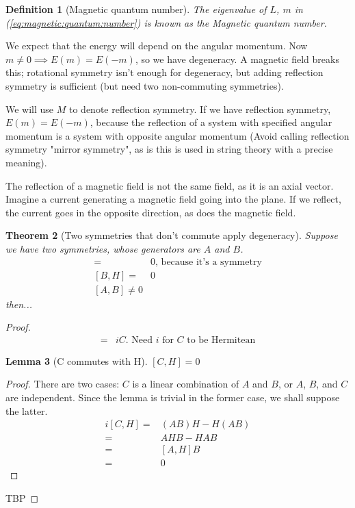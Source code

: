 \documentclass[]{article}
\newtheorem{thm}{Theorem}
\newtheorem{defn}[thm]{Definition}
\newtheorem{lemma}[thm]{Lemma}
\begin{document}
\begin{defn}[Magnetic quantum number]
	The eigenvalue of $L$, $m$ in (\ref{eq:magnetic:quantum:number}) is known as the Magnetic quantum number.
\end{defn}

We expect that the energy will depend on the angular momentum. Now $m\ne 0 \implies E(m)=E(-m)$, so we have degeneracy. A magnetic field breaks this; rotational symmetry isn't enough for degeneracy, but adding reflection symmetry is sufficient (but need two non-commuting symmetries).

We will use $M$ to denote reflection symmetry. If we have reflection symmetry, $E(m)=E(-m)$, because the reflection of a system with specified angular momentum is a system with opposite angular momentum (Avoid calling reflection symmetry "mirror symmetry", as is this is used in string theory with a precise meaning).

The reflection of a magnetic field is not the same field, as it is an axial vector. Imagine a current generating a magnetic field going into the plane. If we reflect, the current goes in the opposite direction, as does the magnetic field.

\begin{thm}[Two symmetries that don't commute apply degeneracy]
	Suppose we have two symmetries, whose generators are $A$ and $B$.
	\begin{align*}
		[A,H]=&0 \text{, because it's a symmetry}\\
		[B,H]=& 0\\
		[A,B]\ne 0
	\end{align*}
	then...
\end{thm}
\begin{proof}
	\begin{align*}
		[A,B]=& i C  \text{. Need $i$ for $C$ to be Hermitean}
	\end{align*}
	\begin{lemma}[C commutes with H]
		$[C,H]=0$
	\end{lemma}
	\begin{proof}
		There are two cases: $C$ is a linear combination of $A$ and $B$, or $A$, $B$, and $C$ are independent. Since the lemma is trivial in the former case, we shall suppose the latter.
		\begin{align*}
		i[C,H] =& (AB)H - H(AB)\\
		=& AHB -HAB\\
		=& [A,H]B\\
		=&0
		\end{align*}
	\end{proof}
	
	TBP
\end{proof}
\end{document}
